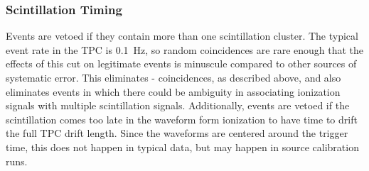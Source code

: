 \documentclass[herrin-thesis.tex]{subfiles}
\begin{document}
\subsubsection{Scintillation Timing}
Events are vetoed if they contain more than one scintillation cluster. The typical event rate in the TPC is \about{}\SI{0.1}{\Hz}, so random coincidences are rare enough that the effects of this cut on legitimate events is minuscule compared to other sources of systematic error. This eliminates - coincidences, as described above, and also eliminates events in which there could be ambiguity in associating ionization signals with multiple scintillation signals. Additionally, events are vetoed if the scintillation comes too late in the waveform form ionization to have time to drift the full TPC drift length. Since the waveforms are centered around the trigger time, this does not happen in typical data, but may happen in source calibration runs.
\end{document}
